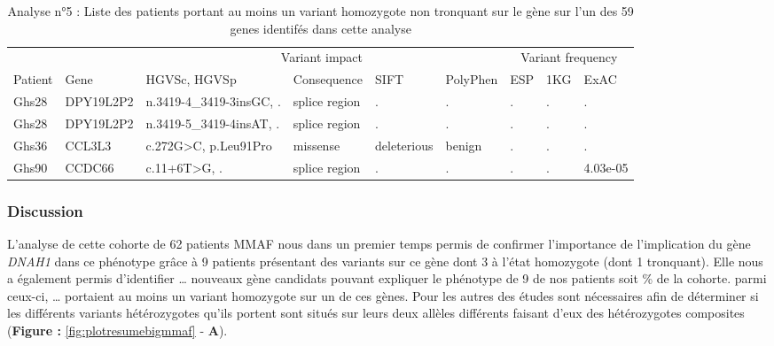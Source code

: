 \documentclass[12pt,twoside]{reedthesis}
\theoremstyle{definition}
\theoremstyle{definition}
\theoremstyle{remark}
\begin{document}
  \begin{landscape}
  \begin{longtable}[t]{lllllllll}
  \caption{\label{tab:tabgrp4moderate}Analyse n°5 : Liste des patients portant au moins un variant homozygote non tronquant sur le gène sur l'un des 59 genes identifés dans cette analyse}\\
  \toprule
  \multicolumn{1}{c}{ } & \multicolumn{1}{c}{ } & \multicolumn{4}{c}{Variant impact} & \multicolumn{3}{c}{Variant frequency} \\
  \cmidrule(l{2pt}r{2pt}){3-6} \cmidrule(l{2pt}r{2pt}){7-9}
  Patient & Gene & HGVSc, HGVSp & Consequence & SIFT & PolyPhen & ESP & 1KG & ExAC\\
  \midrule
  Ghs28 & DPY19L2P2 & n.3419-4\_3419-3insGC, . & splice region & . & . & . & . & .\\
  Ghs28 & DPY19L2P2 & n.3419-5\_3419-4insAT, . & splice region & . & . & . & . & .\\
  Ghs36 & CCL3L3 & c.272G>C, p.Leu91Pro & missense & deleterious & benign & . & . & .\\
  Ghs90 & CCDC66 & c.11+6T>G, . & splice region & . & . & . & . & 4.03e-05\\
  \bottomrule
  \end{longtable}
  \end{landscape}
  
  \newpage
  
  \newpage
  
  \subsubsection{Discussion}\label{discussion-1}
  
  L'analyse de cette cohorte de 62 patients MMAF nous dans un premier
  temps permis de confirmer l'importance de l'implication du gène
  \emph{DNAH1} dans ce phénotype grâce à 9 patients présentant des
  variants sur ce gène dont 3 à l'état homozygote (dont 1 tronquant). Elle
  nous a également permis d'identifier \ldots{} nouveaux gène candidats
  pouvant expliquer le phénotype de 9 de nos patients soit \% de la
  cohorte. parmi ceux-ci, \ldots{} portaient au moins un variant
  homozygote sur un de ces gènes. Pour les autres des études sont
  nécessaires afin de déterminer si les différents variants hétérozygotes
  qu'ils portent sont situés sur leurs deux allèles différents faisant
  d'eux des hétérozygotes composites (\textbf{Figure :
  }\ref{fig:plotresumebigmmaf} - \textbf{A}).
  
\end{document}
